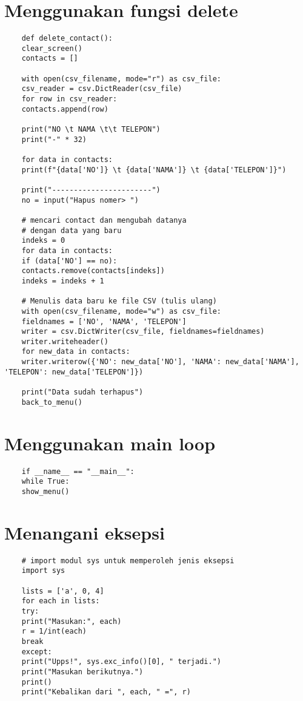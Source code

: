 \documentclass{article}
\begin{document}
\section{Menggunakan fungsi delete}
\begin{lstlisting}
	def delete_contact():
	clear_screen()
	contacts = []
	
	with open(csv_filename, mode="r") as csv_file:
	csv_reader = csv.DictReader(csv_file)
	for row in csv_reader:
	contacts.append(row)
	
	print("NO \t NAMA \t\t TELEPON")
	print("-" * 32)
	
	for data in contacts:
	print(f"{data['NO']} \t {data['NAMA']} \t {data['TELEPON']}")
	
	print("-----------------------")
	no = input("Hapus nomer> ")
	
	# mencari contact dan mengubah datanya
	# dengan data yang baru
	indeks = 0
	for data in contacts:
	if (data['NO'] == no):
	contacts.remove(contacts[indeks])
	indeks = indeks + 1
	
	# Menulis data baru ke file CSV (tulis ulang)
	with open(csv_filename, mode="w") as csv_file:
	fieldnames = ['NO', 'NAMA', 'TELEPON']
	writer = csv.DictWriter(csv_file, fieldnames=fieldnames)
	writer.writeheader()
	for new_data in contacts:
	writer.writerow({'NO': new_data['NO'], 'NAMA': new_data['NAMA'], 'TELEPON': new_data['TELEPON']}) 
	
	print("Data sudah terhapus")
	back_to_menu()
\end{lstlisting}

\section{Menggunakan main loop}
\begin{lstlisting}
	if __name__ == "__main__":
	while True:
	show_menu()
\end{lstlisting}

\section{Menangani eksepsi}
\begin{lstlisting}
	# import modul sys untuk memperoleh jenis eksepsi
	import sys
	
	lists = ['a', 0, 4]
	for each in lists:
	try:
	print("Masukan:", each)
	r = 1/int(each)
	break
	except:
	print("Upps!", sys.exc_info()[0], " terjadi.")
	print("Masukan berikutnya.")
	print()
	print("Kebalikan dari ", each, " =", r)
\end{lstlisting}
\end{document}
